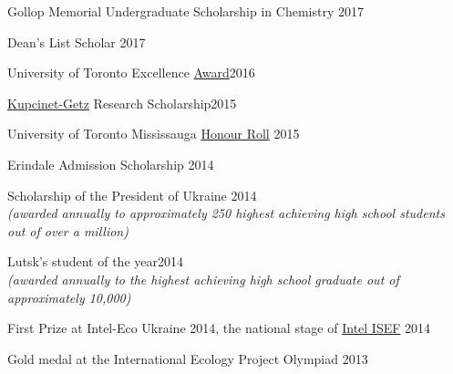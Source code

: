 \documentclass[margin,line]{res}
\begin{document}
\begin{resume}
Gollop Memorial Undergraduate Scholarship in Chemistry \hfill{2017}

\vspace*{-2mm}

Dean’s List Scholar \hfill{2017}

\vspace*{-2mm}

University of Toronto Excellence \href{https://registrar.utoronto.ca/finances-and-funding/utea/}{Award}\hfill{2016}


\vspace*{-2mm}

\href{https://www.weizmann.ac.il/feinberg/admissions/kupcinet-getz-international-summer-school/about-program-0}{Kupcinet-Getz} Research Scholarship\hfill{2015}

\vspace*{-2mm}


University of Toronto Mississauga \href{https://www.utm.utoronto.ca/cps/honour-roll/2014-15}{Honour Roll} \hfill{2015}

\vspace*{-2mm}

Erindale Admission Scholarship  \hfill{2014} 

\vspace*{-2mm}

Scholarship of the President of Ukraine \hfill{2014}\\
{\em(awarded annually to approximately 250 highest achieving high school students out of over a million)}

\vspace*{-2mm}

Lutsk's student of the year\hfill{2014}\\
{\em(awarded annually to the highest achieving high school graduate out of approximately 10,000)}
\vspace*{-2mm}

First Prize at Intel-Eco Ukraine 2014, the national stage of \href{https://student.societyforscience.org/intel-isef}{Intel ISEF} \hfill{2014}

\vspace*{-2mm}

Gold medal at the International Ecology Project Olympiad \hfill{2013}



\end{resume}

\newpage
\end{document}
